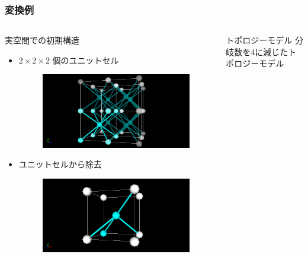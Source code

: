 \documentclass[11pt, dvipdfmx]{beamer}
\begin{document}
\begin{frame}
\frametitle{変換例}
\begin{columns}[totalwidth=1\textwidth]
\begin{block}{実空間での初期構造}
\small
\begin{itemize}
\item
$2\times2\times2$ 個のユニットセル
\vspace{-2mm}
\begin{figure}
\centering
\includegraphics[width=0.8\columnwidth]{./fig/8_per.png}
\end{figure}
\vspace{-2mm}
\item
\vspace{-2mm}
ユニットセルから除去
\vspace{-2mm}
\begin{figure}
\centering
\includegraphics[width=0.8\columnwidth]{./fig/8_4.png}
\end{figure}
\end{itemize}
\end{block}
\begin{exampleblock}{トポロジーモデル}
\small
分岐数を4に減じたトポロジーモデル
\vspace{-2mm}
\begin{figure}
\centering

\end{figure}
\end{exampleblock}
\end{columns}
\end{frame}
\end{document}
